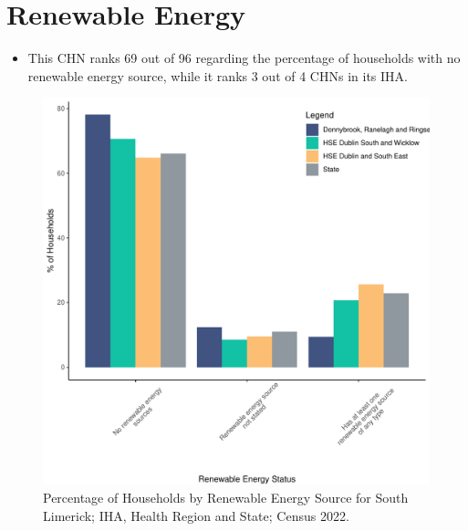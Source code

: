 \documentclass{article}
\begin{document}
\section{Renewable Energy}\label{sect:RE}
\begin{itemize}
\item This CHN ranks  69 out of 96 regarding the percentage of households with no renewable energy source, while it ranks   3 out of 4 CHNs in its IHA.
\end{itemize}
\begin{figure}[H]
	\centering
	\includegraphics[width = 140mm]{../figures/RenewableEnergyED.pdf}
	\caption{Percentage of Households by Renewable Energy Source for South Limerick; IHA, Health Region and State; Census 2022.}
	\label{fig:vbnv}
	\end{figure}
\end{document}
